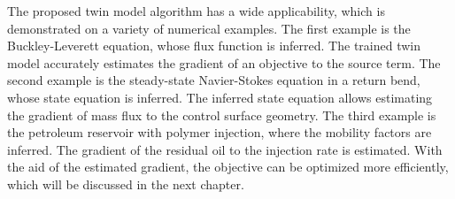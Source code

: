 The proposed twin model algorithm has a wide applicability, which is demonstrated on 
a variety of numerical examples. The first example is the Buckley-Leverett equation,
whose flux function is inferred. The trained twin model accurately estimates 
the gradient of an objective to the source term. 
The second example is the steady-state Navier-Stokes equation in a return bend,
whose state equation is inferred. The inferred state equation allows 
estimating the gradient of mass flux to the control surface geometry.
The third example is the petroleum reservoir with polymer injection, where
the mobility factors are inferred. The gradient of the residual oil to
the injection rate is estimated.
With the aid of the estimated gradient, the objective can be optimized more efficiently,
which will be discussed in the next chapter.

